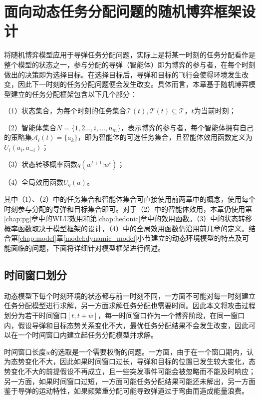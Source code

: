 \section{面向动态任务分配问题的随机博弈框架设计}
\label{sg:framework}

将随机博弈模型应用于导弹任务分配问题，实际上是将某一时刻的任务分配看作是整个模型的状态之一，参与分配的导弹（智能体）即为博弈的参与者，在每个时刻做出的决策即为选择目标。在选择目标后，导弹和目标的飞行会使得环境发生改变，因此下一时刻的任务分配问题便会发生改变。具体而言，本章基于随机博弈模型建立的任务分配框架包含以下几个部分：

（1）状态集合，为每个时刻的任务集合$\mathcal{T}(t), \mathcal{T}(t) \subseteq \mathcal{T}$，$t$为当前时刻；

（2）智能体集合$N=\{1,2\dots,i,\dots,n_m\}$，表示博弈的参与者，每个智能体拥有自己的策略集$\mathcal{A}_i(t) = \{a_k\}$，即为智能体的可选任务集合，且智能体效用函数定义为$U_i(a_i,a_{-i})$；

（3）状态转移概率函数$q(w^{t+1}|w^t)$；

（4）全局效用函数$U_g(a)$。

其中（1）、（2）中的任务集合和智能体集合可直接使用前两章中的概念，使用每个时刻参与分配的导弹和目标集合即可。对于（2）中的智能体效用，本章仍使用第\ref{chap:pg}章中的WLU效用和第\ref{chap:hedonic}章中的效用函数。（3）中的状态转移概率函数取决于模型框架的设计，（4）中的全局效用函数仍沿用前几章的定义。结合第\ref{chap:model}章\ref{model:dynamic_model}小节建立的动态环境模型的特点及可能面临的问题，下面将详细针对模型框架进行阐述。


\subsection{时间窗口划分}
\label{game_stage:time_window}

动态模型下每个时刻环境的状态都与前一时刻不同，一方面不可能对每一时刻建立任务分配模型进行求解，另一方面求解任务分配也需要时间。因此本文将攻击过程划分为若干时间窗口$[t,t+w]$，每一时间窗口作为一个博弈阶段，在同一窗口内，假设导弹和目标态势关系变化不大，最优任务分配结果不会发生改变，因此可以在一个时间窗口内建立起任务分配模型并求解。

时间窗口长度$w$的选取是一个需要权衡的问题。一方面，由于在一个窗口期内，认为态势变化不大，因此如果时间窗口过长，导弹和目标的位置已发生较大变化，态势变化不大的前提假设不再成立，且一些突发事件可能会被忽略而不能及时响应；另一方面，如果时间窗口过短，一方面可能任务分配结果可能还未解出，另一方面鉴于导弹的运动特性，如果频繁重分配可能导致弹道过于弯曲而造成能量浪费。


